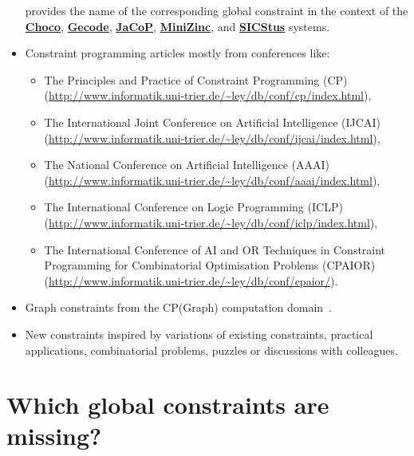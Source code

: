 \begin{itemize}
  provides the name of the corresponding global constraint
  in the context of the
  \href{http://choco.emn.fr/}{{\bf Choco}},
  \href{http://www.gecode.org/}{{\bf Gecode}},
  \href{http://www.jacop.eu/}{{\bf JaCoP}},
  \href{http://www.minizinc.org/}{{\bf MiniZinc}}, and
  \href{http://www.sics.se/sicstus/}{{\bf SICStus}} systems.
\item
Constraint programming articles mostly from conferences like:
  \begin{itemize}
  \item
  The Principles and Practice of Constraint Programming (CP)\\
  ({\footnotesize \url{http://www.informatik.uni-trier.de/~ley/db/conf/cp/index.html}}),
  \item
  The International Joint Conference on Artificial Intelligence (IJCAI)\\
  ({\footnotesize \url{http://www.informatik.uni-trier.de/~ley/db/conf/ijcai/index.html}}),
  \item
  The National Conference on Artificial Intelligence (AAAI)\\
  ({\footnotesize \url{http://www.informatik.uni-trier.de/~ley/db/conf/aaai/index.html}}),
  \item
  The International Conference on Logic Programming (ICLP)\\
  ({\footnotesize \url{http://www.informatik.uni-trier.de/~ley/db/conf/iclp/index.html}}),
  \item
  The International Conference of AI and OR Techniques in Constraint Programming for Combinatorial Optimisation
  Problems (CPAIOR)\\
  ({\footnotesize \url{http://www.informatik.uni-trier.de/~ley/db/conf/cpaior/}}).
  \end{itemize}

\item
Graph constraints from the CP(Graph) computation domain~\cite{Dooms06}.

\item
New constraints inspired by variations of existing constraints, practical applications, combinatorial problems, puzzles or discussions with colleagues. 

\end{itemize}


\section{Which global constraints are missing?}

